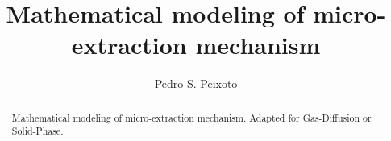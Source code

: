 \documentclass[final,1p,times]{elsarticle}
\begin{document}
\begin{frontmatter}



\title{Mathematical modeling of micro-extraction mechanism
}


\author{Pedro S. Peixoto}

\address{University of São Paulo}

\begin{abstract}
Mathematical modeling of micro-extraction mechanism. Adapted for Gas-Diffusion or Solid-Phase.
\end{abstract}



\begin{keyword}



\end{keyword}

\end{frontmatter}
\end{document}
